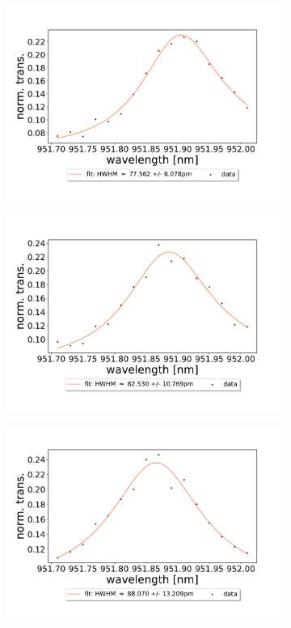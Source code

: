 \begin{figure}[h!]
\begin{subfigure}[b]{0.49\textwidth}
        \includegraphics[width=\textwidth]{figures/results/double fano fits/70um_M3:M5_fit_4.pdf}
        \caption{}
        \label{fig:70um_M3:M5_fit_3}
    \end{subfigure}
    \begin{subfigure}[b]{0.49\textwidth}
        \includegraphics[width=\textwidth]{figures/results/double fano fits/70um_M3:M5_fit_5.pdf}
        \caption{}
        \label{fig:70um_M3:M5_fit_4}
    \end{subfigure}
    \begin{subfigure}[b]{0.49\textwidth}
        \includegraphics[width=\textwidth]{figures/results/double fano fits/70um_M3:M5_fit_7.pdf}

\end{subfigure}
\end{figure}
